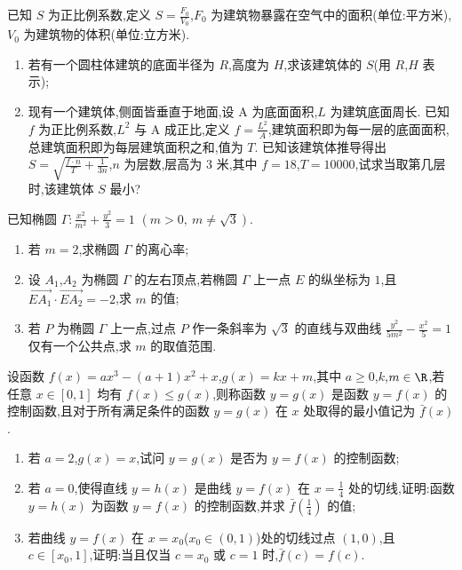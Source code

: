 \begin{problem}
已知 \(S\) 为正比例系数,定义 \(S=\frac{F_0}{V_0}\),\(F_0\) 为建筑物暴露在空气中的面积(单位:平方米),\(V_0\) 为建筑物的体积(单位:立方米).

\begin{enumerate}
\item 若有一个圆柱体建筑的底面半径为 \(R\),高度为 \(H\),求该建筑体的 \(S\)(用 \(R\),\(H\) 表示);
\item 现有一个建筑体,侧面皆垂直于地面,设 A 为底面面积,\(L\) 为建筑底面周长. 已知 \(f\) 为正比例系数,\(L^2\) 与 A 成正比,定义 \(f=\frac{L^2}{A}\),建筑面积即为每一层的底面面积,总建筑面积即为每层建筑面积之和,值为 \(T\). 已知该建筑体推导得出 \(S=\sqrt{\frac{f\cdot n}{T}+\frac{1}{3n}}\),\(n\) 为层数,层高为 \(3\) 米,其中 \(f=18\),\(T=10000\),试求当取第几层时,该建筑体 \(S\) 最小?
\end{enumerate}
\end{problem}

\begin{problem}
已知椭圆 \(\Gamma:\frac{x^2}{m^2}+\frac{y^2}{3}=1\) \(\left(m>0,\ m\neq \sqrt3\right)\).

\begin{enumerate}
\item 若 \(m=2\),求椭圆 \(\Gamma\) 的离心率;
\item 设 \(A_1\),\(A_2\) 为椭圆 \(\Gamma\) 的左右顶点,若椭圆 \(\Gamma\) 上一点 \(E\) 的纵坐标为 \(1\),且 \(\overrightarrow{EA_1}\cdot\overrightarrow{EA_2}=-2\),求 \(m\) 的值;
\item 若 \(P\) 为椭圆 \(\Gamma\) 上一点,过点 \(P\) 作一条斜率为 \(\sqrt3\) 的直线与双曲线 \(\frac{y^2}{5m^2}-\frac{x^2}{5}=1\) 仅有一个公共点,求 \(m\) 的取值范围.
\end{enumerate}
\end{problem}

\begin{problem}
设函数 \(f(x)=ax^3-(a+1)x^2+x\),\(g(x)=kx+m\),其中 \(a\ge 0\),\(k\),\(m\in \R\),若任意 \(x\in[0,1]\) 均有 \(f(x)\le g(x)\),则称函数 \(y=g(x)\) 是函数 \(y=f(x)\) 的控制函数,且对于所有满足条件的函数 \(y=g(x)\) 在 \(x\) 处取得的最小值记为 \(\bar f(x)\).

\begin{enumerate}
\item 若 \(a=2\),\(g(x)=x\),试问 \(y=g(x)\) 是否为 \(y=f(x)\) 的控制函数;
\item 若 \(a=0\),使得直线 \(y=h(x)\) 是曲线 \(y=f(x)\) 在 \(x=\frac14\) 处的切线,证明:函数 \(y=h(x)\) 为函数 \(y=f(x)\) 的控制函数,并求 \(\bar f\left(\frac14\right)\) 的值;
\item 若曲线 \(y=f(x)\) 在 \(x=x_0\)(\(x_0\in(0,1)\))处的切线过点 \((1,0)\),且 \(c\in[x_0,1]\),证明:当且仅当 \(c=x_0\) 或 \(c=1\) 时,\(\bar f(c)=f(c)\).
\end{enumerate}
\end{problem}

